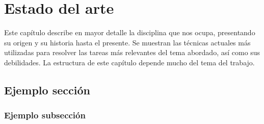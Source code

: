 
\chapter{Estado del arte}
\label{ch:EstadoArte}

\noindent Este capítulo describe en mayor detalle la disciplina que nos ocupa, presentando su origen y su historia hasta el presente. Se muestran las técnicas actuales más utilizadas para resolver las tareas más relevantes del tema abordado, así como sus debilidades. La estructura de este capítulo depende mucho del tema del trabajo.

\section{Ejemplo sección}
\label{sec:Ejemplo_seccion2}

\subsection{Ejemplo subsección}
\label{sec:Ejemplo_subSeccion2}